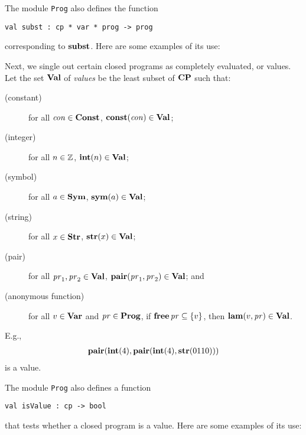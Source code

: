 The module \texttt{Prog} also defines the function
\begin{verbatim}
val subst : cp * var * prog -> prog
\end{verbatim}
corresponding to $\mathbf{subst}$.  Here are some examples of its use:


Next, we single out certain closed programs as completely evaluated,
or values.  Let the set $\mathbf{Val}$ of \emph{values} be the least subset of
$\mathbf{CP}$ such that:
\begin{description}
\item[\quad(constant)] for all $\mathit{con}\in\mathbf{Const}$,
  $\mathbf{const}(\mathit{con})\in\mathbf{Val}$;

\item[\quad(integer)] for all $n\in\mathbb{Z}$, $\mathbf{int}(n)\in\mathbf{Val}$;

\item[\quad(symbol)] for all $a\in\mathbf{Sym}$, $\mathbf{sym}(a)\in\mathbf{Val}$;

\item[\quad(string)] for all $x\in\mathbf{Str}$, $\mathbf{str}(x)\in\mathbf{Val}$;

\item[\quad(pair)] for all $\mathit{pr}_1,\mathit{pr}_2\in\mathbf{Val}$,
  $\mathbf{pair}(\mathit{pr}_1,\mathit{pr}_2)\in\mathbf{Val}$; and

\item[\quad(anonymous function)] for all $v\in\mathbf{Var}$ and
  $\mathit{pr}\in\mathbf{Prog}$, if $\mathbf{free}\,\mathit{pr}\subseteq\{v\}$, then
  $\mathbf{lam}(v,\mathit{pr})\in\mathbf{Val}$.
\end{description}
E.g.,
\begin{gather*}
\mathbf{pair}(\mathbf{int}(4), \mathbf{pair}(\mathbf{int}(4), \mathbf{str}(0110)))  
\end{gather*}
is a value.

The module \texttt{Prog} also defines a function
\begin{verbatim}
val isValue : cp -> bool
\end{verbatim}
that tests whether a closed program is a value.  Here are some
examples of its use:


